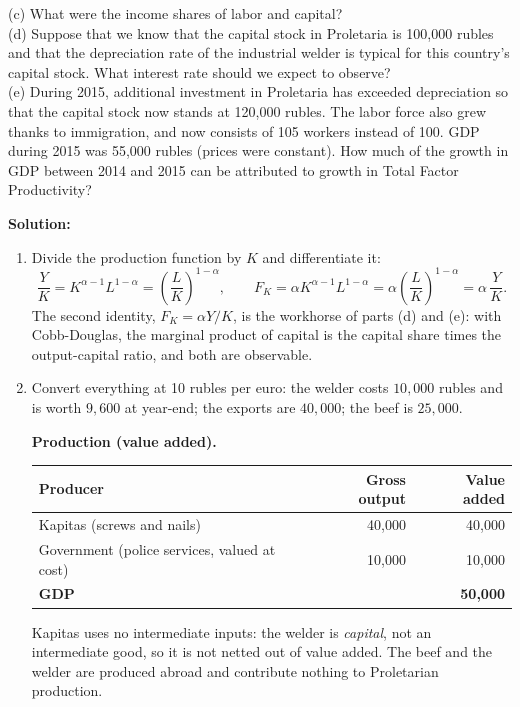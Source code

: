\documentclass[12pt, letterpaper]{article}
\begin{document}
\begin{tcolorbox}[oddbox,title={Problem 5.7 \quad GDP Accounting, Interest Rates and Growth Accounting}]
\begin{tcolorbox}[questionbox]
(c) What were the income shares of labor and capital?\\
(d) Suppose that we know that the capital stock in Proletaria is 100,000 rubles and that the
depreciation rate of the industrial welder is typical for this country's capital stock. What
interest rate should we expect to observe?\\
(e) During 2015, additional investment in Proletaria has exceeded depreciation so that the
capital stock now stands at 120,000 rubles. The labor force also grew thanks to immigration,
and now consists of 105 workers instead of 100. GDP during 2015 was 55,000 rubles (prices
were constant). How much of the growth in GDP between 2014 and 2015 can be attributed to
growth in Total Factor Productivity?
\end{tcolorbox}

\textbf{Solution:}
\begin{enumerate}

\item Divide the production function by $K$ and differentiate it:
\[
\frac{Y}{K}=K^{\alpha-1}L^{1-\alpha}=\boxed{\left(\frac{L}{K}\right)^{1-\alpha}},
\qquad
F_K=\alpha K^{\alpha-1}L^{1-\alpha}=\boxed{\alpha\left(\frac{L}{K}\right)^{1-\alpha}
=\alpha\,\frac{Y}{K}} .
\]
The second identity, $F_K=\alpha Y/K$, is the workhorse of parts (d) and (e): with
Cobb-Douglas, the marginal product of capital is the capital share times the output-capital
ratio, and both are observable.

\item Convert everything at 10 rubles per euro: the welder costs $10{,}000$ rubles and is
worth $9{,}600$ at year-end; the exports are $40{,}000$; the beef is $25{,}000$.

\smallskip
\textbf{Production (value added).}
\begin{center}
\begin{tabular}{@{}lrr@{}}
\toprule
Producer & Gross output & Value added \\
\midrule
Kapitas (screws and nails) & 40{,}000 & 40{,}000 \\
Government (police services, valued at cost) & 10{,}000 & 10{,}000 \\
\midrule
\textbf{GDP} & & \textbf{50{,}000} \\
\bottomrule
\end{tabular}
\end{center}
Kapitas uses no intermediate inputs: the welder is \emph{capital}, not an intermediate good,
so it is not netted out of value added. The beef and the welder are produced abroad and
contribute nothing to Proletarian production.


\end{enumerate}
\end{tcolorbox}
\end{document}
